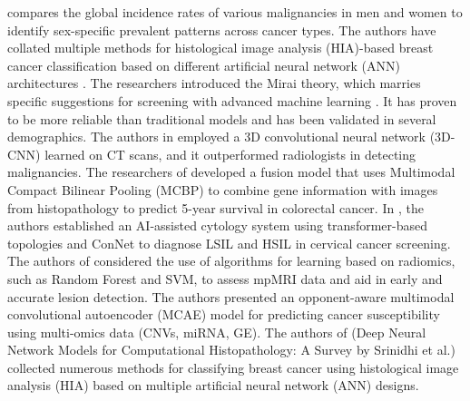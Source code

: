\documentclass[conference]{IEEEtran}
\begin{document}
 compares the global incidence rates of various malignancies in men and women to identify sex-specific prevalent patterns across cancer types. The authors have collated multiple methods for histological image analysis (HIA)-based breast cancer classification based on different artificial neural network (ANN) architectures \cite{1}. The researchers introduced the Mirai theory, which marries specific suggestions for screening with advanced machine learning \cite{2}. It has proven to be more reliable than traditional models and has been validated in several demographics. The authors in \cite{3} employed a 3D convolutional neural network (3D-CNN) learned on CT scans, and it outperformed radiologists in detecting malignancies. The researchers of \cite{4} developed a fusion model that uses Multimodal Compact Bilinear Pooling (MCBP) to combine gene information with images from histopathology to predict 5-year survival in colorectal cancer. In \cite{5}, the authors established an AI-assisted cytology system using transformer-based topologies and ConNet to diagnose LSIL and HSIL in cervical cancer screening. The authors of \cite{5} considered the use of algorithms for learning based on radiomics, such as Random Forest and SVM, to assess mpMRI data and aid in early and accurate lesion detection. The authors \cite{7} presented an opponent-aware multimodal convolutional autoencoder (MCAE) model for predicting cancer susceptibility using multi-omics data (CNVs, miRNA, GE). The authors of \cite{8} (Deep Neural Network Models for Computational Histopathology: A Survey by Srinidhi et al.) collected numerous methods for classifying breast cancer using histological image analysis (HIA) based on multiple artificial neural network (ANN) designs.
\end{document}
